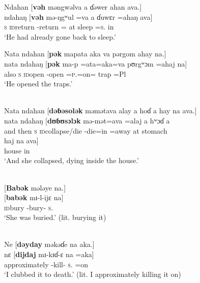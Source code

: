 \ea \label{ex:8:41}
Ndahan  [\textbf{vəh}  məngwəlva  a  ɗəwer  ahan  ava.]\\
\gll  ndahaŋ  [\textbf{vəh}    mə-ŋgʷul =va    a  ɗuwɛr  =ahaŋ    ava]\\
      \textsc{s}    \textsc{id}return    {\NOM}{}-return ={\PRF}  at  sleep  =\textsc{s}.{\POSS}  in\\
\glt  ‘He had already gone back to sleep.’
\z

\ea \label{ex:8:42}
Nata  ndahan  [\textbf{pək}  mapata  aka  va  pərgom  ahay  na.]\\
\gll  nata    ndahaŋ  [\textbf{pək}  ma-p    =ata=aka=va    pʊrgʷɔm  =ahaj  na]\\
      also    \textsc{s}  \textsc{id}open  {\NOM}{}-open =\textsc{p}.{\IO}=on={\PRF}  trap  =Pl  {\PSP}\\
\glt  ‘He opened the traps.’ 
\z

\ea \label{ex:8:43}\\
Nata  ndahan  [\textbf{dəɓəsolək} məmətava  alay  a  hoɗ  a  hay  na  ava.]\\
\gll  nata    ndahaŋ  [\textbf{dʊɓʊsɔlɔk}   mə-mət=ava =alaj   a   hʷɔɗ      a\\ 
      {and then}  \textsc{s}   \textsc{id}collapse/die  {\NOM}{}-die=in =away   at   stomach  {\GEN}\\  
      
      \medskip
\gll haj na ava]\\
     house   {\PSP}    in\\
\glt  ‘And she collapsed, dying inside the house.’
\z

\ea \label{ex:8:44}\\
{}[\textbf{Babək} mələye  na.]\\
\gll  {}[\textbf{babək} mɪ-l-ijɛ  na]\\
      \textsc{id}bury      {\NOM}-bury-{\CL}   \textsc{s}.{\DO}\\
\glt  ‘She was buried.’ (lit. burying it)
\z

\ea \label{ex:8:45}\\
Ne  [\textbf{dəyday} məkəɗe  na  aka.]\\
\gll  nɛ  [\textbf{dijdaj} mɪ-kɪɗ-ɛ  na      =aka]\\
      {\oneS}    approximately     {\NOM}{}-kill-{\CL}   \textsc{s}.{\DO}   =on\\
\glt  ‘I clubbed it to death.’ (lit. I approximately killing it on)
\z

